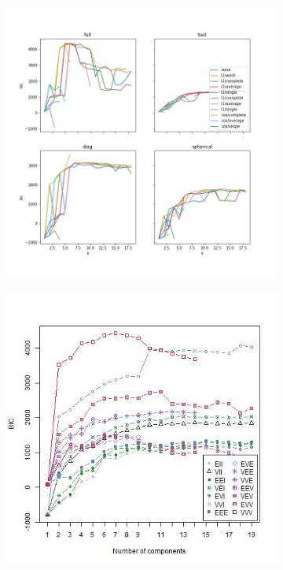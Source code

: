 \documentclass{article}
\begin{document}
\begin{figure}[h!]
\centering
\begin{subfigure}[b]{0.35\linewidth}
  \includegraphics[width=\linewidth]{drosophila_python_bicplot.jpg}
\caption{}
\end{subfigure}
\begin{subfigure}[b]{0.35\linewidth}
  \includegraphics[width=\linewidth]{drosophila_r_bicplot.jpg}

\end{subfigure}
\end{figure}
\end{document}
